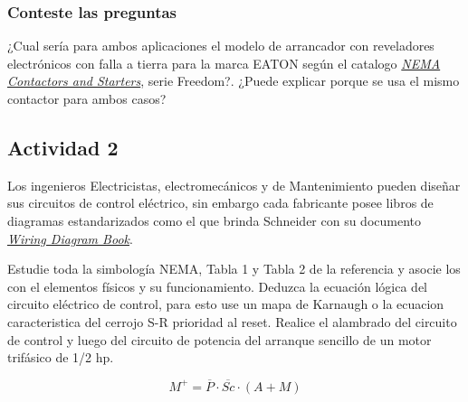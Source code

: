 \subsubsection{Conteste las preguntas}

¿Cual sería para ambos aplicaciones el modelo de arrancador con reveladores electrónicos con falla a tierra para la marca EATON según el catalogo \href{https://www.eaton.com/content/dam/eaton/products/industrialcontrols-drives-automation-sensors/nema-contactors-and-starters-v5-t2-ca08100006e.pdf}{\textit{NEMA Contactors and Starters}}, serie Freedom?. ¿Puede explicar porque se usa el mismo contactor para ambos casos?


\subsection{Actividad 2}
  Los ingenieros Electricistas, electromecánicos y de Mantenimiento pueden diseñar sus circuitos de control eléctrico, sin embargo cada fabricante posee libros de diagramas estandarizados como el que brinda  Schneider con su documento \href{https://download.schneider-electric.com/files?p_enDocType=Catalog&p_File_Name=0140CT9201.pdf&p_Doc_Ref=0140CT9201&_ga=2.160182845.1491407618.1677858387-1733391740.1677858387}{\textit{Wiring Diagram Book}}\cite{Scheneider2}.
 
 Estudie toda la simbología NEMA, Tabla 1 y Tabla 2 de la referencia \cite{Scheneider2} y asocie los con el elementos físicos y su funcionamiento.
 Deduzca la ecuación lógica del circuito eléctrico de control, para esto use un mapa de Karnaugh o la ecuacion caracteristica del cerrojo S-R prioridad al reset.
 Realice el alambrado del circuito de control y luego del circuito de potencia del arranque sencillo de un motor trifásico de 1/2 hp.

\newpage

\begin{equation*}
    M^+ = \overline{P} \cdot \overline{Sc} \cdot (A+M)
\end{equation*}

 \begin{figure}[H]
    \centering
 \end{figure}

